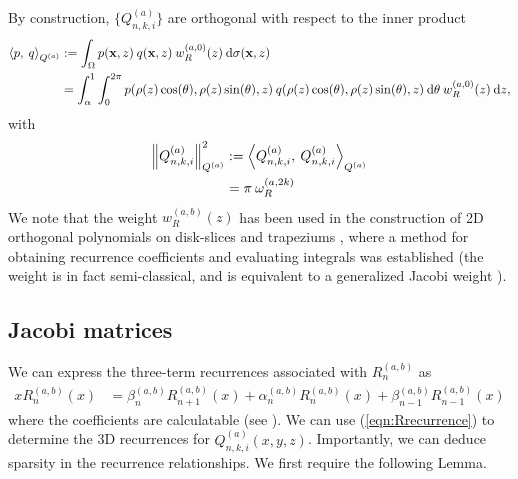 \documentclass[11pt, oneside]{article}   	%
\newcommand{\genjac}{R}
\newcommand{\genjacw}{w_\genjac}
\newcommand{\normgenjac}{\omega_\genjac}
\newcommand{\scop}{Q}
\newcommand{\scopnki}{\scop_{n,k,i}}
\newcommand{\scopa}{\scop^{(a)}}
\newcommand{\scopnkia}{\scopnki^{(a)}}
\newcommand{\xvec}{\mathbf{x}}
\begin{document}
By construction, $\{\scopnkia\}$ are orthogonal with respect to the inner product
\begin{align}
	\ip< p, \: q >_{\scopa} &:= \int_\Omega p(\xvec, z) \: q(\xvec, z) \: \genjacw^{(a,0)}(z) \: \D \sigma(\xvec, z) \\
	&= \int_\alpha^1 \int_0^{2\pi} p(\rho(z) \cos(\theta), \rho(z) \sin(\theta), z) \: q(\rho(z) \cos(\theta), \rho(z) \sin(\theta), z) \: \D \theta \: \genjacw^{(a,0)}(z) \: \D z,
\end{align}
with
\begin{align}
	\norm{\scopnkia}_{\scopa}^2 &:= \ip< \scopnkia, \: \scopnkia >_{\scopa} \nonumber \\
	&= \pi \: \normgenjac^{(a, 2k)} \label{eqn:normscop}
\end{align}
We note that the weight $\genjacw^{(a,b)}(z)$ has been used in the construction of 2D orthogonal polynomials on disk-slices and trapeziums \cite{snowball2019sparse}, where a method for obtaining recurrence coefficients and evaluating integrals was established (the weight is in fact semi-classical, and is equivalent to a generalized Jacobi weight \cite[\S5]{magnus1995painleve}). 


\subsection{Jacobi matrices}

We can express the three-term recurrences associated with $\genjac_n^{(a,b)}$ as
\begin{align}
	x \genjac_n^{(a,b)}(x) &= \beta_n^{(a,b)} \genjac_{n+1}^{(a,b)}(x) + \alpha_n^{(a,b)} \genjac_n^{(a,b)}(x) + \beta_{n-1}^{(a,b)} \genjac_{n-1}^{(a,b)}(x) \label{eqn:Rrecurrence}
\end{align}
where the coefficients are calculatable (see \cite{snowball2019sparse}). We can use (\ref{eqn:Rrecurrence}) to determine the 3D recurrences for $\scopnkia(x,y,z)$. Importantly, we can deduce sparsity in the recurrence relationships.  We first require the following Lemma.
\end{document}
